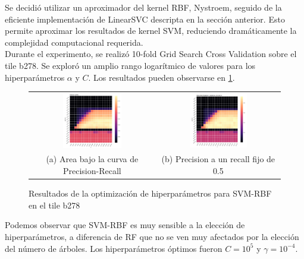 Se decidió utilizar un aproximador del kernel RBF, Nystroem, seguido de la eficiente implementación de LinearSVC descripta en la sección anterior. Esto permite aproximar los resultados de kernel SVM, reduciendo dramáticamente la complejidad computacional requerida.\\

Durante el experimento, se realizó 10-fold Grid Search Cross Validation sobre el tile b278. Se exploró un amplio rango logarítmico de valores para los hiperparámetros $\alpha$ y $C$. Los resultados pueden observarse en \ref{fig:optimisationsvmk}. 

\begin{figure}[h!]
\begin{tabular}{cc}
  \includegraphics[width=0.49\textwidth]{Kap3/Figure_2.png} &   \includegraphics[width=0.49\textwidth]{Kap3/Figure_3.png} \\
(a) Area bajo la curva de Precision-Recall & (b) Precision a un recall fijo de 0.5 
\end{tabular}
\caption{Resultados de la optimización de hiperparámetros para SVM-RBF en el tile b278}
\label{fig:optimisationsvmk}
\end{figure}


Podemos observar que SVM-RBF es muy sensible a la elección de hiperparámetros, a diferencia de RF que no se ven muy afectados por la elección del número de árboles. Los hiperparámetros óptimos fueron $C=10^5$ y $\gamma=10^{-4}$.


